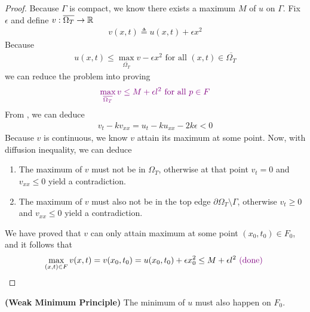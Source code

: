 \documentclass{report}
\begin{document}
\begin{proof}
Because $\Gamma $ is compact, we know there exists a maximum $M$ of $u$ on $\Gamma $. Fix $\epsilon $ and define $v:\overline{\Omega_T}\rightarrow \mathbb{R}$
\begin{align*}
v(x,t)\triangleq u(x,t)+ \epsilon x^2
\end{align*}
Because 
\begin{align*}
u(x,t) \leq \max_{\overline{\Omega_T}}v - \epsilon x^2\text{ for all }(x,t)\in \overline{\Omega_T}
\end{align*}
we can reduce the problem into proving 
\begin{align*}
\textcolor{violet}{\max_{\overline{\Omega_T}}v\leq M+\epsilon l^2\text{ for all }p \in F}
\end{align*}
From , we can deduce
\begin{align*}
v_t-kv_{xx}=u_t-ku_{xx}-2k\epsilon  <0
\end{align*}
Because $v$ is continuous, we know $v$ attain its maximum at some point. Now, with diffusion inequality, we can deduce 
\begin{enumerate}[label=(\alph*)]
  \item The maximum of $v$ must not be in $\Omega_T$, otherwise at that point $v_t=0$ and  $v_{xx}\leq 0$ yield a contradiction. 
  \item The maximum of $v$ must also not be in the top edge $\partial \Omega_T \setminus \Gamma $, otherwise $v_t\geq 0$ and $v_{xx}\leq 0$ yield a contradiction. 
\end{enumerate}
We have proved that $v$ can only attain maximum at some point $(x_0,t_0)\in F_0$, and it follows that 
\begin{align*}
\max_{(x,t) \in F}v(x,t)=v(x_0,t_0)=u(x_0,t_0)+\epsilon  x_0^2 \leq M+ \epsilon l^2  \textcolor{violet}{\text{ (done) }}
\end{align*}
\end{proof}
\begin{corollary}
\textbf{(Weak Minimum Principle)} The minimum of $u$ must also happen on $F_0$.  
\end{corollary}
\end{document}
